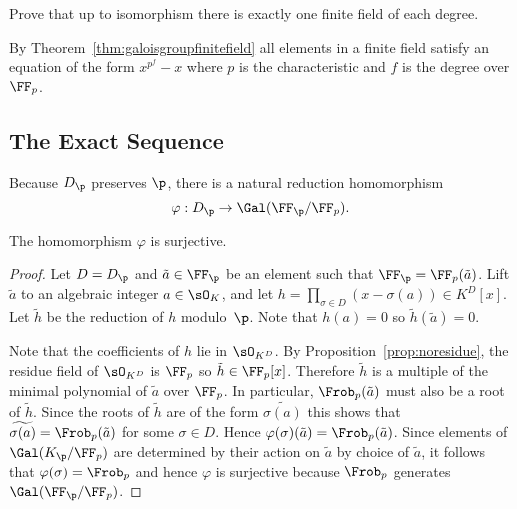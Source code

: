 \begin{exercise}
  Prove that up to isomorphism there is
  exactly one finite field of each degree.

  \begin{hint}
    By Theorem~\ref{thm:galoisgroupfinitefield}
    all elements in a finite field satisfy an equation
    of the form $x^{p^f} - x$ where $p$ is the
    characteristic and $f$ is the degree over $\FF_p$.
  \end{hint}
\end{exercise}


\subsection{The Exact Sequence}\label{sec:exactseq}

Because $D_\p$ preserves $\p$, there is a natural reduction homomorphism
\[
  \varphi:D_\p \to \Gal(\FF_{\p}/\FF_p).
\]
\begin{theorem}\label{thm:redsurj}
  The homomorphism $\varphi$ is surjective.
\end{theorem}
\begin{proof}
  Let $D = D_\p$ and $\tilde{a} \in \FF_{\p}$ be an element
  such that $\FF_{\p} = \FF_p(\tilde{a})$.
  Lift $\tilde{a}$ to an algebraic integer $a\in \sO_K$, and let
  $h = \prod_{\sigma \in D}(x-\sigma(a))\in K^D[x]$.
  Let $\tilde{h}$ be the reduction of $h$ modulo~$\p$.
  Note that $h(a) = 0$ so $\tilde{h}(\tilde{a}) = 0$.

  Note that the coefficients of $h$ lie in $\sO_{K^D}$.
  By Proposition~\ref{prop:noresidue}, the residue field of $\sO_{K^D}$
  is $\FF_p$ so $\tilde{h} \in \FF_p[x]$.
  Therefore $\tilde{h}$ is a multiple of the minimal polynomial of
  $\tilde{a}$ over $\FF_p$. In particular, $\Frob_p(\tilde{a})$
  must also be a root of $\tilde{h}$.
  Since the roots of $\tilde{h}$ are of the form $\widetilde{\sigma(a)}$
  this shows that $\widetilde{\sigma(a)} = \Frob_p(\tilde{a})$
  for some $\sigma\in D$.
  Hence $\varphi(\sigma)(\tilde{a}) = \Frob_p(\tilde{a})$. Since elements
  of $\Gal(K_\p/\FF_p)$ are determined by their action on $\tilde{a}$
  by choice of $\tilde{a}$, it follows that $\varphi(\sigma) = \Frob_p$
  and hence $\varphi$ is surjective because $\Frob_p$
  generates $\Gal(\FF_{\p}/\FF_p)$.
\end{proof}

